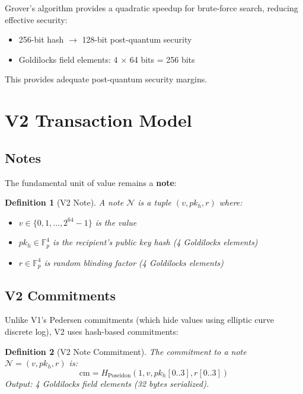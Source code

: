 \documentclass[11pt,a4paper]{article}
\newtheorem{definition}{Definition}
\begin{document}
Grover's algorithm provides a quadratic speedup for brute-force search, reducing effective security:

\begin{itemize}
    \item 256-bit hash $\rightarrow$ 128-bit post-quantum security
    \item Goldilocks field elements: 4 $\times$ 64 bits = 256 bits
\end{itemize}

This provides adequate post-quantum security margins.

\section{V2 Transaction Model}

\subsection{Notes}

The fundamental unit of value remains a \textbf{note}:

\begin{definition}[V2 Note]
A note $\mathcal{N}$ is a tuple $(v, pk_h, r)$ where:
\begin{itemize}
    \item $v \in \{0, 1, \ldots, 2^{64}-1\}$ is the value
    \item $pk_h \in \mathbb{F}_p^4$ is the recipient's public key hash (4 Goldilocks elements)
    \item $r \in \mathbb{F}_p^4$ is random blinding factor (4 Goldilocks elements)
\end{itemize}
\end{definition}

\subsection{V2 Commitments}

Unlike V1's Pedersen commitments (which hide values using elliptic curve discrete log), V2 uses hash-based commitments:

\begin{definition}[V2 Note Commitment]
The commitment to a note $\mathcal{N} = (v, pk_h, r)$ is:
\begin{equation}
\text{cm} = H_{\text{Poseidon}}(1, v, pk_h[0..3], r[0..3])
\end{equation}
Output: 4 Goldilocks field elements (32 bytes serialized).
\end{definition}
\end{document}
